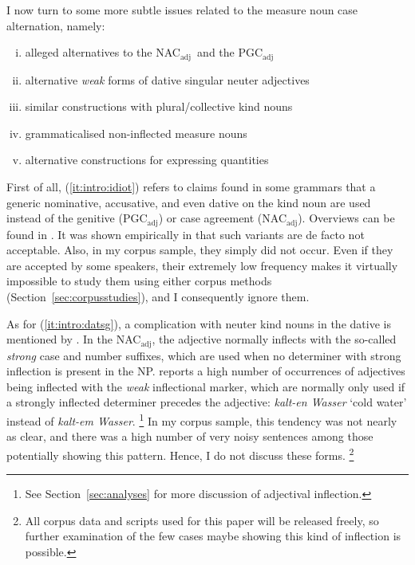 \documentclass[USenglish]{article}
\newcommand{\Sub}[1]{\ensuremath{\mathrm{_{#1}}}}
\newcommand{\NACa}{NAC\Sub{adj}}
\newcommand{\PGCa}{PGC\Sub{adj}}
\begin{document}
I now turn to some more subtle issues related to the measure noun case alternation, namely:

\begin{enumerate}[i.]
  \item{\label{it:intro:idiot} alleged alternatives to the \NACa\ and the \PGCa}
  \item{\label{it:intro:datsg} alternative \textit{weak} forms of dative singular neuter adjectives}
  \item{\label{it:intro:plurl} similar constructions with plural/collective kind nouns}
  \item{\label{it:intro:noifl} grammaticalised non-inflected measure nouns}
  \item{\label{it:intro:other} alternative constructions for expressing quantities}
\end{enumerate}

\vspace{-1\baselineskip}

First of all, (\ref{it:intro:idiot}) refers to claims found in some grammars that a generic nominative, accusative, and even dative on the kind noun are used instead of the genitive (\PGCa) or case agreement (\NACa).
Overviews can be found in \citealp{Hentschel1993,Zimmer2015}.
It was shown empirically in \cite{Hentschel1993} that such variants are de facto not acceptable.
Also, in my corpus sample, they simply did not occur.
Even if they are accepted by some speakers, their extremely low frequency makes it virtually impossible to study them using either corpus methods (Section~\ref{sec:corpusstudies}), and I consequently ignore them.

As for (\ref{it:intro:datsg}), a complication with neuter kind nouns in the dative is mentioned by \citet[20--22]{Zimmer2015}.
In the \NACa, the adjective normally inflects with the so-called \textit{strong} case and number suffixes, which are used when no determiner with strong inflection is present in the NP.
\cite{Zimmer2015} reports a high number of occurrences of adjectives being inflected with the \textit{weak} inflectional marker, which are normally only used if a strongly inflected determiner precedes the adjective: \textit{kalt-en Wasser} `cold water' instead of \textit{kalt-em Wasser}.%
\footnote{See Section~\ref{sec:analyses} for more discussion of adjectival inflection.}
In my corpus sample, this tendency was not nearly as clear, and there was a high number of very noisy sentences among those potentially showing this pattern.
Hence, I do not discuss these forms.%
\footnote{All corpus data and scripts used for this paper will be released freely, so further examination of the few cases maybe showing this kind of inflection is possible.}
\end{document}
